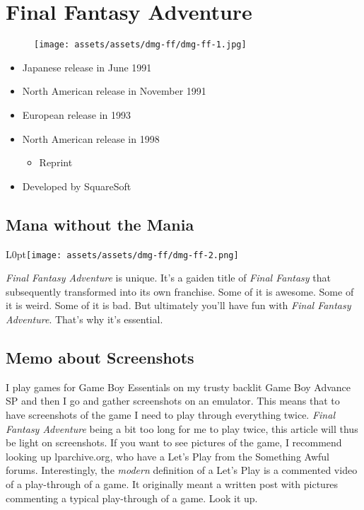 \documentclass{book}
\begin{document}
\chapter*{Final Fantasy Adventure}
\vspace{\baselineskip}\begin{figure}[H]{\texttt{[image: assets/assets/dmg-ff/dmg-ff-1.jpg]}}\end{figure}\vspace{\baselineskip}
\begin{itemize}[left=0pt, nosep]
\item Japanese release in June 1991
\item North American release in November 1991
\item European release in 1993
\item North American release in 1998
\begin{itemize}
\item Reprint
\end{itemize}
\item Developed by SquareSoft

\end{itemize}
\newpage\FloatBarrier\section*{Mana without the Mania}
\begin{wrapfigure}{L}{0pt}{\texttt{[image: assets/assets/dmg-ff/dmg-ff-2.png]}}\end{wrapfigure}\noindent
\emph{Final Fantasy Adventure} is unique. It’s a gaiden title of \emph{Final Fantasy} that subsequently transformed into its own franchise. Some of it is awesome. Some of it is weird. Some of it is bad. But ultimately you’ll have fun with \emph{Final Fantasy Adventure}. That’s why it’s essential.\par
\FloatBarrier\section*{Memo about Screenshots}
I play games for Game Boy Essentials on my trusty backlit Game Boy Advance SP and then I go and gather screenshots on an emulator. This means that to have screenshots of the game I need to play through everything twice. \emph{Final Fantasy Adventure} being a bit too long for me to play twice, this article will thus be light on screenshots. If you want to see pictures of the game, I recommend looking up lparchive.org, who have a Let’s Play from the Something Awful forums. Interestingly, the \emph{modern} definition of a Let’s Play is a commented video of a play-through of a game. It originally meant a written post with pictures commenting a typical play-through of a game. Look it up.\par
\end{document}

